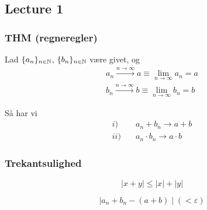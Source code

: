 \subsection{Lecture 1}
\subsubsection{THM (regneregler)}
Lad \(\{a_n\}_{n\in \mathbb{N}}\), \(\{b_n\}_{n\in \mathbb{N}}\) være givet, og
\begin{align*}
    a_n \xrightarrow{n \to \infty} a \equiv \lim_{n \to \infty} a_n = a \\
    b_n \xrightarrow{n \to \infty} b \equiv \lim_{n \to \infty} b_n = b
\end{align*}

Så har vi
\begin{align*}
    i) \quad &a_n + b_n \to a + b \\
    ii) \quad &a_n \cdot b_n \to a \cdot b
\end{align*}

\subsubsection{Trekantsulighed}
\begin{equation}
    \mid x + y \mid \le |x| + |y|
\end{equation}

\begin{equation}
    \mid a_n + b_n - (a + b) \mid ( < \varepsilon)
\end{equation}
